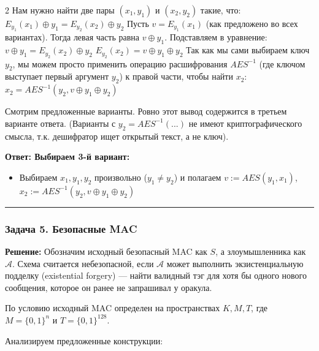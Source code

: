﻿\documentclass[10pt,a4paper,landscape]{extarticle}
\newcommand{\tightlist}{}
\begin{document}
\begin{multicols*}{2}
Нам нужно найти две пары \((x_1, y_1)\) и \((x_2, y_2)\) такие, что: \(E_{y_1}(x_1) \oplus y_1 = E_{y_2}(x_2) \oplus y_2\) Пусть \(v = E_{y_1}(x_1)\) (как предложено во всех вариантах). Тогда левая часть равна \(v \oplus y_1\). Подставляем в уравнение: \(v \oplus y_1 = E_{y_2}(x_2) \oplus y_2\) \(E_{y_2}(x_2) = v \oplus y_1 \oplus y_2\) Так как мы сами выбираем ключ \(y_2\), мы можем просто применить операцию расшифрования \(AES^{-1}\) (где ключом выступает первый аргумент \(y_2\)) к правой части, чтобы найти \(x_2\): \(x_2 = AES^{-1}(y_2, v \oplus y_1 \oplus y_2)\)

Смотрим предложенные варианты. Ровно этот вывод содержится в третьем варианте ответа. (Варианты с \(y_2 = AES^{-1}(...)\) не имеют криптографического смысла, т.к. дешифратор ищет открытый текст, а не ключ).

\textbf{Ответ: Выбираем 3-й вариант:}

\begin{itemize}
\tightlist
\item
  Выбираем \(x_1, y_1, y_2\) произвольно (\(y_1 \neq y_2\)) и полагаем \(v := AES(y_1, x_1)\), \(x_2 := AES^{-1}(y_2, v \oplus y_1 \oplus y_2)\)
\end{itemize}

\begin{center}\rule{0.5\linewidth}{0.5pt}\end{center}

\subsubsection{Задача 5. Безопасные MAC}\label{ux437ux430ux434ux430ux447ux430-5.-ux431ux435ux437ux43eux43fux430ux441ux43dux44bux435-mac}

\textbf{Решение:} Обозначим исходный безопасный MAC как \(S\), а злоумышленника как \(\mathcal{A}\). Схема считается небезопасной, если \(\mathcal{A}\) может выполнить экзистенциальную подделку (existential forgery) --- найти валидный тэг для хотя бы одного нового сообщения, которое он ранее не запрашивал у оракула.

По условию исходный MAC определен на пространствах \(K, M, T\), где \(M=\{0,1\}^n\) и \(T=\{0,1\}^{128}\).

Анализируем предложенные конструкции:


\end{multicols*}
\end{document}
